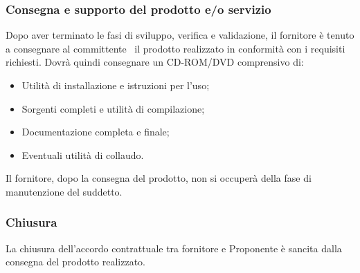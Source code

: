 \documentclass[../NormeDiProgetto.tex]{subfiles}
\begin{document}
			\subsubsection{Consegna e supporto del prodotto e/o servizio}
				Dopo aver terminato le fasi di sviluppo, verifica e validazione, il fornitore è tenuto
				a consegnare al committente \vardanega\ il prodotto realizzato in conformità con i
				requisiti richiesti. Dovrà quindi consegnare un CD-ROM/DVD comprensivo di:
				\begin{itemize}
					\item Utilità di installazione e istruzioni per l'uso;
					\item Sorgenti completi e utilità di compilazione;
					\item Documentazione completa e finale;
					\item Eventuali utilità di collaudo.
				\end{itemize}
				Il fornitore, dopo la consegna del prodotto, non si occuperà della fase di
				manutenzione del suddetto.
			\subsubsection{Chiusura}
				La chiusura dell'accordo contrattuale tra fornitore e Proponente è sancita dalla
				consegna del prodotto realizzato.
\end{document}
